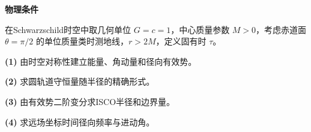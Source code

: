 \textbf{物理条件}\par 在Schwarzschild时空中取几何单位 \(G=c=1\)，中心质量参数 \(M>0\)，考虑赤道面 \(\theta=\pi/2\) 的单位质量类时测地线，\(r>2M\)，定义固有时 \(\tau\)。
\par\noindent\textbf{(1)} 由时空对称性建立能量、角动量和径向有效势。
\par\noindent\textbf{(2)} 求圆轨道守恒量随半径的精确形式。
\par\noindent\textbf{(3)} 由有效势二阶变分求ISCO半径和边界量。
\par\noindent\textbf{(4)} 求远场坐标时间径向频率与进动角。
